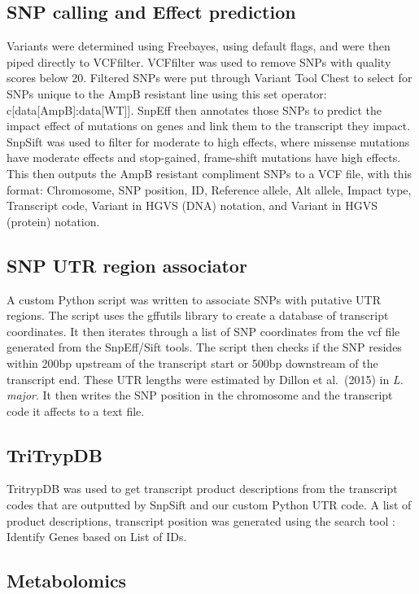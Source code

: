 \documentclass{bioinfo}
\begin{document}
\subsection{SNP calling and Effect prediction}

Variants were determined using Freebayes, using default flags, and were
then piped directly to VCFfilter. VCFfilter was used to remove SNPs with
quality scores below 20. Filtered SNPs were put through Variant Tool
Chest to select for SNPs unique to the AmpB resistant line using this
set operator: c{[}data{[}AmpB{]}:data{[}WT{]}{]}. SnpEff then annotates
those SNPs to predict the impact effect of mutations on genes and link
them to the transcript they impact. SnpSift was used to filter for
moderate to high effects, where missense mutations have moderate effects
and stop-gained, frame-shift mutations have high effects. This then
outputs the AmpB resistant compliment SNPs to a VCF file, with this
format: Chromosome, SNP position, ID, Reference allele, Alt allele,
Impact type, Transcript code, Variant in HGVS (DNA) notation, and
Variant in HGVS (protein) notation.

\subsection{SNP UTR region associator}

A custom Python script was written to associate SNPs with putative UTR
regions. The script uses the gffutils library to create a database of
transcript coordinates. It then iterates through a list of SNP
coordinates from the vcf file generated from the SnpEff/Sift tools. The
script then checks if the SNP resides within 200bp upstream of the
transcript start or 500bp downstream of the transcript end. These UTR
lengths were estimated by Dillon et al.~(2015) in \emph{L. major}. It
then writes the SNP position in the chromosome and the transcript code
it affects to a text file.

\subsection{TriTrypDB}

TritrypDB was used to get transcript product descriptions from the
transcript codes that are outputted by SnpSift and our custom Python UTR
code. A list of product descriptions, transcript position was generated
using the search tool : Identify Genes based on List of IDs.

\subsection{Metabolomics}
\end{document}

